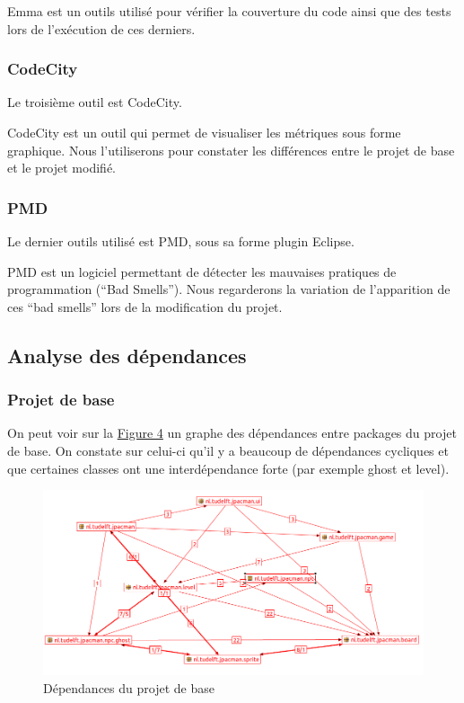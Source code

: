 \documentclass[a4paper,12pt]{report} %
\begin{document}
Emma est un outils utilisé pour vérifier la couverture du code ainsi
que des tests lors de l'exécution de ces derniers.

\subsubsection{CodeCity}
Le troisième outil est CodeCity.

CodeCity est un outil qui permet de visualiser les métriques sous
forme graphique. Nous l'utiliserons pour constater les différences
entre le projet de base et le projet modifié.

\subsubsection{PMD}
Le dernier outils utilisé est PMD, sous sa forme plugin Eclipse.

PMD est un logiciel permettant de détecter les mauvaises pratiques
de programmation (``Bad Smells''). Nous regarderons la variation
de l'apparition de ces ``bad smells'' lors de la modification du
projet.

\subsection{Analyse des dépendances}
\subsubsection{Projet de base}
On peut voir sur la \hyperref[figure4]{Figure 4} un graphe des dépendances entre packages
du projet de base. On constate sur celui-ci qu'il y a beaucoup de
dépendances cycliques et que certaines classes ont une interdépendance
forte (par exemple ghost et level).

\begin{figure}[!h]
\begin{center}\includegraphics[scale=0.5]{ressources/final_initial_dependencies}\end{center}
\caption{Dépendances du projet de base}\label{figure4}
\end{figure}
\end{document}
